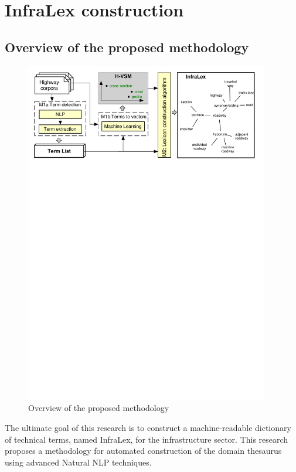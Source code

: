 \documentclass[Journal, InsideFigs, DoubleSpace]{ascelike} %
\begin{document}
\section{InfraLex construction} \label{sec:infralex}
\subsection{Overview of the proposed methodology} \label{sec:proposed_method} %
%
\begin{figure}[t]
	\centering
	\includegraphics[width=0.95\textwidth]{Figure1_overview_methodology}
	\caption{Overview of the proposed methodology}
	\label{fig:framework}
\end{figure}
%
The ultimate goal of this research is to construct a machine-readable dictionary of technical terms, named InfraLex, for the infrastructure sector.  This research proposes a methodology for automated construction of the domain thesaurus using advanced Natural NLP techniques. 
\end{document}
